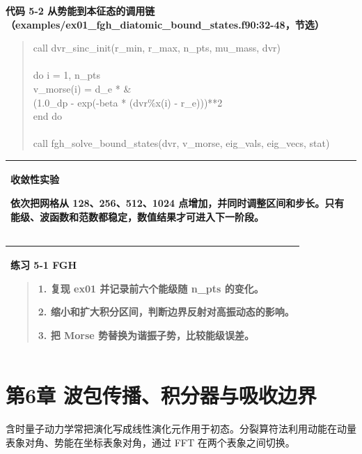 \documentclass[UTF8,openany,11pt,fontset=fandol]{ctexbook}
\begin{document}
\textbf{代码 5-2
从势能到本征态的调用链（examples/ex01\_fgh\_diatomic\_bound\_states.f90:32-48，节选）}

\begin{quote}
call dvr\_sinc\_init(r\_min, r\_max, n\_pts, mu\_mass, dvr)\\
~\\
do i = 1, n\_pts\\
v\_morse(i) = d\_e * \&\\
(1.0\_dp - exp(-beta * (dvr\%x(i) - r\_e)))**2\\
end do\\
~\\
call fgh\_solve\_bound\_states(dvr, v\_morse, eig\_vals, eig\_vecs,
stat)
\end{quote}

\begin{longtable}[]{@{}l@{}}
\toprule
\endhead
\begin{minipage}[t]{0.97\columnwidth}\raggedright
\textbf{收敛性实验}

依次把网格从 128、256、512、1024
点增加，并同时调整区间和步长。只有能级、波函数和范数都稳定，数值结果才可进入下一阶段。\strut
\end{minipage}\tabularnewline
\bottomrule
\end{longtable}

\begin{longtable}[]{@{}l@{}}
\toprule
\endhead
\begin{minipage}[t]{0.97\columnwidth}\raggedright
\textbf{练习 5-1 FGH}

\begin{quote}
1. 复现 ex01 并记录前六个能级随 n\_pts 的变化。

2. 缩小和扩大积分区间，判断边界反射对高振动态的影响。

3. 把 Morse 势替换为谐振子势，比较能级误差。
\end{quote}\strut
\end{minipage}\tabularnewline
\bottomrule
\end{longtable}

\chapter{第6章 波包传播、积分器与吸收边界}\label{ux7b2c6ux7ae0-ux6ce2ux5305ux4f20ux64adux79efux5206ux5668ux4e0eux5438ux6536ux8fb9ux754c}

含时量子动力学常把演化写成线性演化元作用于初态。分裂算符法利用动能在动量表象对角、势能在坐标表象对角，通过
FFT 在两个表象之间切换。
\end{document}
